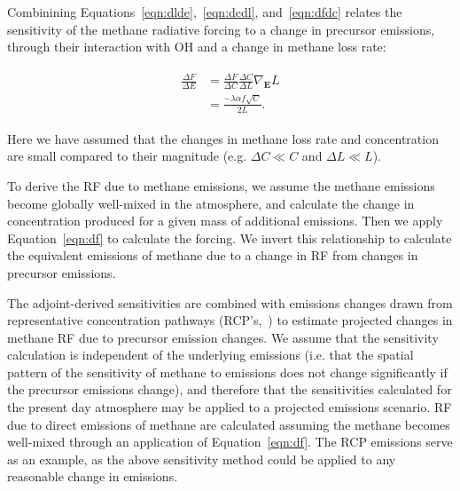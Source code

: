 Combinining Equations~\ref{eqn:dlde},~\ref{eqn:dcdl}, and~\ref{eqn:dfdc} relates the sensitivity of the methane radiative forcing to a change in precursor emissions, through their interaction with OH and a change in methane loss rate:

\begin{equation}
\begin{align}
\begin{split}
\frac{\Delta F}{\Delta E} &= \frac{\Delta F}{\Delta C} \frac{\Delta C}{\Delta L} \nabla_{\mathbf{E}} L \\
                          &= \frac{-\lambda \alpha f \sqrt{C}}{2L}.
\end{split}
\label{eqn:dfde}
\end{align}
\end{equation}

Here we have assumed that the changes in methane loss rate and concentration are small compared to their magnitude (e.g. $\Delta C \ll C$ and $\Delta L \ll L$).

To derive the RF due to methane emissions, we assume the methane emissions become globally well-mixed in the atmosphere, and calculate the change in concentration produced for a given mass of additional emissions. Then we apply Equation~\ref{eqn:df} to calculate the forcing. We invert this relationship to calculate the equivalent emissions of methane due to a change in RF from changes in precursor emissions.

The adjoint-derived sensitivities are combined with emissions changes drawn from representative concentration pathways (RCP's,~\citet{ref:lamarque2011,ref:vanvuuren2011}) to estimate projected changes in methane RF due to precursor emission changes. We assume that the sensitivity calculation is independent of the underlying emissions (i.e. that the spatial pattern of the sensitivity of methane to emissions does not change significantly if the precursor emissions change), and therefore that the sensitivities calculated for the present day atmosphere may be applied to a projected emissions scenario. RF due to direct emissions of methane are calculated assuming the methane becomes well-mixed through an application of Equation~\ref{eqn:df}. The RCP emissions serve as an example, as the above sensitivity method could be applied to any reasonable change in emissions.

